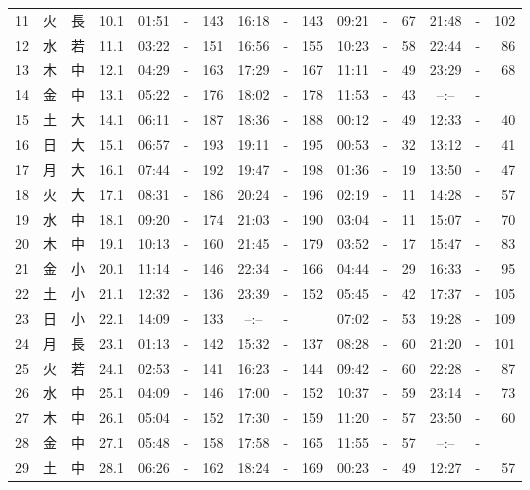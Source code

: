 \documentclass[12pt.a4j]{jsarticle}
\begin{document}
\begin{center}
\begin{table}[ht]
\begin{tabular}{|rc|cr|ccrccr|ccrccr|}
11 & 火 & 長 & 10.1 &  01:51 &-& 143  &  16:18 &-& 143  &   09:21 &-&  67  &   21:48 &-& 102  \\
12 & 水 & 若 & 11.1 &  03:22 &-& 151  &  16:56 &-& 155  &   10:23 &-&  58  &   22:44 &-&  86  \\
13 & 木 & 中 & 12.1 &  04:29 &-& 163  &  17:29 &-& 167  &   11:11 &-&  49  &   23:29 &-&  68  \\
14 & 金 & 中 & 13.1 &  05:22 &-& 176  &  18:02 &-& 178  &   11:53 &-&  43  &   --:-- &-&     \\
15 & 土 & 大 & 14.1 &  06:11 &-& 187  &  18:36 &-& 188  &   00:12 &-&  49  &   12:33 &-&  40  \\
16 & 日 & 大 & 15.1 &  06:57 &-& 193  &  19:11 &-& 195  &   00:53 &-&  32  &   13:12 &-&  41  \\
17 & 月 & 大 & 16.1 &  07:44 &-& 192  &  19:47 &-& 198  &   01:36 &-&  19  &   13:50 &-&  47  \\
18 & 火 & 大 & 17.1 &  08:31 &-& 186  &  20:24 &-& 196  &   02:19 &-&  11  &   14:28 &-&  57  \\
19 & 水 & 中 & 18.1 &  09:20 &-& 174  &  21:03 &-& 190  &   03:04 &-&  11  &   15:07 &-&  70  \\
20 & 木 & 中 & 19.1 &  10:13 &-& 160  &  21:45 &-& 179  &   03:52 &-&  17  &   15:47 &-&  83  \\
21 & 金 & 小 & 20.1 &  11:14 &-& 146  &  22:34 &-& 166  &   04:44 &-&  29  &   16:33 &-&  95  \\
22 & 土 & 小 & 21.1 &  12:32 &-& 136  &  23:39 &-& 152  &   05:45 &-&  42  &   17:37 &-& 105  \\
23 & 日 & 小 & 22.1 &  14:09 &-& 133  &  --:-- &-&     &   07:02 &-&  53  &   19:28 &-& 109  \\
24 & 月 & 長 & 23.1 &  01:13 &-& 142  &  15:32 &-& 137  &   08:28 &-&  60  &   21:20 &-& 101  \\
25 & 火 & 若 & 24.1 &  02:53 &-& 141  &  16:23 &-& 144  &   09:42 &-&  60  &   22:28 &-&  87  \\
26 & 水 & 中 & 25.1 &  04:09 &-& 146  &  17:00 &-& 152  &   10:37 &-&  59  &   23:14 &-&  73  \\
27 & 木 & 中 & 26.1 &  05:04 &-& 152  &  17:30 &-& 159  &   11:20 &-&  57  &   23:50 &-&  60  \\
28 & 金 & 中 & 27.1 &  05:48 &-& 158  &  17:58 &-& 165  &   11:55 &-&  57  &   --:-- &-&     \\
29 & 土 & 中 & 28.1 &  06:26 &-& 162  &  18:24 &-& 169  &   00:23 &-&  49  &   12:27 &-&  57  \\

\end{tabular}
\end{table}
\end{center}
\end{document}
